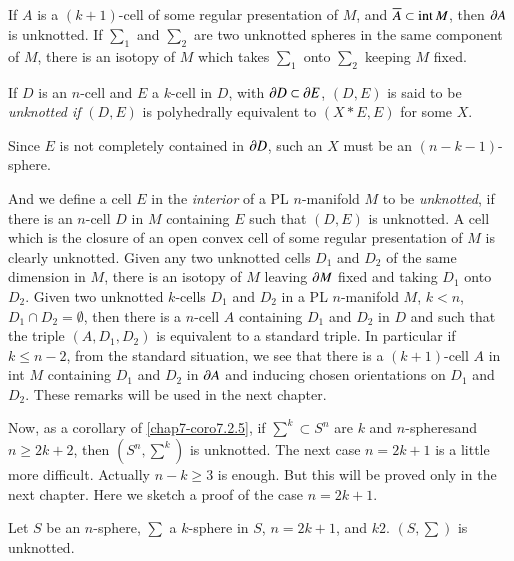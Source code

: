 \setcounter{subsection}{5}
\subsection{}\label{chap7-sec7.2.6}
If $A$ is a $(k+1)$-cell of some regular presentation of $M$, and $\overline{A}\subset \text{int\,}M$, then $\partial A$ is unknotted. If $\sum_{1}$ and $\sum_{2}$ are two unknotted spheres in the same component of $M$, there is an isotopy of $M$ which takes $\sum_{1}$ onto $\sum_{2}$ keeping $M$ fixed.

\setcounter{proposition}{6}
\begin{definition}\label{chap7-defi7.2.7}
If $D$ is an $n$-cell and $E$ a $k$-cell in $D$, with $\partial D\subset \partial E$, $(D,E)$ is said to be {\em unknotted if} $(D,E)$ is polyhedrally equivalent to $(X\ast E,E)$ for some $X$.
\end{definition}

Since $E$ is not completely contained in $\partial D$, such an $X$ must be an $(n-k-1)$-sphere.

And we define a cell $E$ in the {\em interior} of a PL $n$-manifold $M$ to be {\em unknotted}, if there is an $n$-cell $D$ in $M$ containing $E$ such that $(D,E)$ is unknotted. A cell which is the closure of an open convex cell of some regular presentation of $M$ is clearly unknotted. Given any two unknotted cells $D_{1}$ and $D_{2}$ of the same dimension in $M$, there is an isotopy of $M$ leaving $\partial M$ fixed and taking $D_{1}$ onto $D_{2}$. Given two unknotted $k$-cells $D_{1}$ and $D_{2}$ in a PL $n$-manifold $M$, $k<n$, $D_{1}\cap D_{2}=\emptyset$, then there is a $n$-cell $A$ containing $D_{1}$ and $D_{2}$ in $D$ and such that the triple $(A,D_{1},D_{2})$ is equivalent to a standard triple. In particular if $k\leq n-2$, from the standard situation, we see that there is a $(k+1)$-cell $A$ in int $M$ containing $D_{1}$ and $D_{2}$ in $\partial A$ and inducing chosen orientations on $D_{1}$ and $D_{2}$. These remarks will be used in the next chapter.

Now, as a corollary of \ref{chap7-coro7.2.5}, if $\sum^{k}\subset S^{n}$ are $k$ and $n$-spheres\pageoriginale and $n\geq 2k+2$, then $(S^{n},\sum^{k})$ is unknotted. The next case $n=2k+1$ is a little more difficult. Actually $n-k\geq 3$ is enough. But this will be proved only in the next chapter. Here we sketch a proof of the case $n=2k+1$.

\begin{proposition}\label{chap7-prop7.2.8}
Let $S$ be an $n$-sphere, $\sum$ a $k$-sphere in $S$, $n=2k+1$, and $k 2$. $(S,\sum)$ is unknotted.
\end{proposition}

